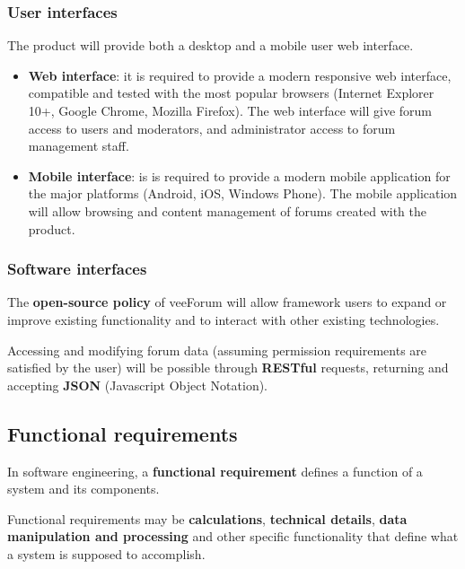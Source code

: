 \documentclass[12pt]{report}
\renewcommand\emph{\textbf}
\begin{document}
                    \subsubsection{User interfaces}
                        The product will provide both a desktop and a mobile user web interface.

                        \begin{itemize}
                            \item \emph{Web interface}: it is required to provide a modern responsive web interface, compatible and tested with the most popular browsers (Internet Explorer 10+, Google Chrome, Mozilla Firefox). The web interface will give forum access to users and moderators, and administrator access to forum management staff.
                            \item \emph{Mobile interface}: is is required to provide a modern mobile application for the major platforms (Android, iOS, Windows Phone). The mobile application will allow browsing and content management of forums created with the product.
                        \end{itemize}

                    \subsubsection{Software interfaces}
                        The \emph{open-source policy} of veeForum will allow framework users to expand or improve existing functionality and to interact with other existing technologies.

                        Accessing and modifying forum data (assuming permission requirements are satisfied by the user) will be possible through \emph{RESTful} requests, returning and accepting \emph{JSON} (Javascript Object Notation).

                \subsection{Functional requirements}
                    In software engineering, a \emph{functional requirement} defines a function of a system and its components. 

                    Functional requirements may be \emph{calculations}, \emph{technical details}, \emph{data manipulation and processing} and other specific functionality that define what a system is supposed to accomplish. 
\end{document}
